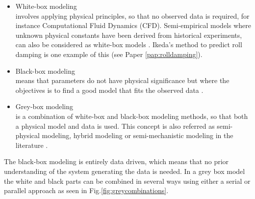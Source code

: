\begin{itemize}
    \item White-box modeling \\
    involves applying physical principles, so that no observed data is required, for instance Computational Fluid Dynamics (CFD). Semi-empirical models where unknown physical constants have been derived from historical experiments, can also be considered as white-box models \cite{leifsson_grey-box_2008}. Ikeda's method to predict roll damping \cite{ikeda_components_1978} is one example of this (see Paper \ref{pap:rolldamping}).  

    \item Black-box modeling \\
    means that parameters do not have physical significance but where the objectives is to find a good model that fits the observed data \cite{lindskog_tools_1995}.
    
    \item Grey-box modeling \\
    is a combination of white-box and black-box modeling methods, so that both a physical model and data is used. This concept is also referred as semi-physical modeling, hybrid modeling or semi-mechanistic modeling in the literature \cite{leifsson_grey-box_2008}. 
\end{itemize}

\noindent The black-box modeling is entirely data driven, which means that no prior understanding of the system generating the data is needed.
In a grey box model the white and black parts can be combined in several ways using either a serial or parallel approach \cite{leifsson_grey-box_2008} as seen in Fig.\ref{fig:greycombinations}. 

